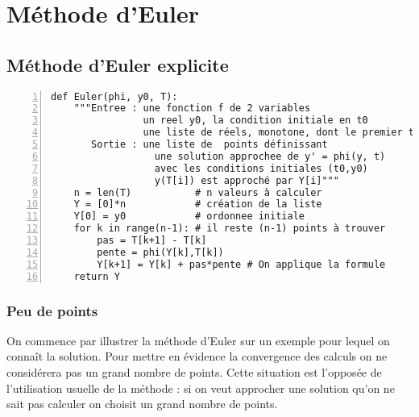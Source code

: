 \chapter{Méthode d'Euler}
\thispagestyle{empty}
\section{Méthode d'Euler explicite}
\begin{lstlisting}[numbers=left, caption=Euler explicite]
def Euler(phi, y0, T):
    """Entree : une fonction f de 2 variables
                un reel y0, la condition initiale en t0
                une liste de réels, monotone, dont le premier terme est t0
       Sortie : une liste de  points définissant 
                  une solution approchee de y' = phi(y, t)
                  avec les conditions initiales (t0,y0)
                  y(T[i]) est approché par Y[i]"""
    n = len(T)           # n valeurs à calculer
    Y = [0]*n            # création de la liste
    Y[0] = y0            # ordonnee initiale
    for k in range(n-1): # il reste (n-1) points à trouver
        pas = T[k+1] - T[k]
        pente = phi(Y[k],T[k])
        Y[k+1] = Y[k] + pas*pente # On applique la formule
    return Y
\end{lstlisting}
\subsection{Peu de points}
On commence par illustrer la méthode d'Euler sur un exemple pour lequel on connaît la solution. Pour mettre en évidence la convergence des calculs on ne considérera pas un grand nombre de points. Cette situation est l'opposée de l'utilisation usuelle de la méthode : si on veut approcher une solution qu'on ne sait pas calculer on choisit un grand nombre de points.

